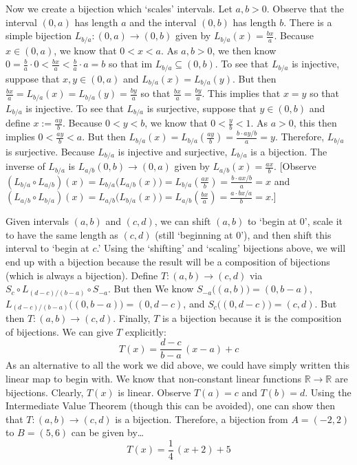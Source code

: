 \documentclass[11pt,letterpaper]{article}
\begin{document}
\begin{enumerate}[(a)]
Now we create a bijection which `scales' intervals. Let $a, b > 0$. Observe that the interval $(0, a)$ has length $a$ and the interval $(0, b)$ has length $b$. There is a simple bijection $L_{b/a}: (0, a) \to (0, b)$ given by $L_{b/a}(x)= \frac{bx}{a}$. Because $x \in (0, a)$, we know that $0 < x < a$. As $a, b > 0$, we then know $0= \frac{b}{a} \cdot 0 < \frac{bx}{a} < \frac{b}{a} \cdot a= b$ so that $\text{im } L_{b/a} \subseteq (0, b)$. To see that $L_{b/a}$ is injective, suppose that $x, y \in (0, a)$ and $L_{b/a}(x)= L_{b/a}(y)$. But then $\frac{bx}{a}= L_{b/a}(x)= L_{b/a}(y)= \frac{by}{a}$ so that $\frac{bx}{a}= \frac{by}{a}$. This implies that $x= y$ so that $L_{b/a}$ is injective. To see that $L_{b/a}$ is surjective, suppose that $y \in (0, b)$ and define $x:= \frac{ay}{b}$. Because $0 < y < b$, we know that $0 < \frac{y}{b} < 1$. As $a > 0$, this then implies $0 < \frac{ay}{b} < a$. But then $L_{b/a}(x)= L_{b/a}(\frac{ay}{b})= \frac{b \cdot ay/b}{a}= y$. Therefore, $L_{b/a}$ is surjective. Because $L_{b/a}$ is injective and surjective, $L_{b/a}$ is a bijection. The inverse of $L_{b/a}$ is $L_{a/b} (0, b) \to (0, a)$ given by $L_{a/b}(x)= \frac{ax}{b}$. [Observe $(L_{b/a} \circ L_{a/b})(x)= L_{b/a} \big( L_{a/b}(x) \big)= L_{b/a}(\frac{ax}{b})= \frac{b \cdot ax/b}{a}= x$ and $(L_{a/b} \circ L_{b/a})(x)= L_{a/b} \big( L_{b/a}(x) \big)= L_{a/b}(\frac{bx}{a})= \frac{a \cdot bx/a}{b}= x$.] \pspace

Given intervals $(a, b)$ and $(c, d)$, we can shift $(a, b)$ to `begin at $0$', scale it to have the same length as $(c, d)$ (still `beginning at $0$'), and then shift this interval to `begin at $c$.' Using the `shifting' and `scaling' bijections above, we will end up with a bijection because the result will be a composition of bijections (which is always a bijection). Define $T: (a, b) \to (c, d)$ via $S_c \circ L_{(d-c)/(b-a)} \circ S_{-a}$. But then We know $S_{-a} \big( (a, b) \big)= (0, b - a)$, $L_{(d-c)/(b-a)} \big( (0, b - a) \big)= (0, d - c)$, and $S_c \big( (0, d - c) \big)= (c, d)$. But then $T: (a, b) \to (c, d)$. Finally, $T$ is a bijection because it is the composition of bijections. We can give $T$ explicitly:
	\[
	T(x)= \dfrac{d - c}{b - a}\, (x - a) + c
	\]
As an alternative to all the work we did above, we could have simply written this linear map to begin with. We know that non-constant linear functions $\mathbb{R} \to \mathbb{R}$ are bijections. Clearly, $T(x)$ is linear. Observe $T(a)= c$ and $T(b)= d$. Using the Intermediate Value Theorem (though this can be avoided), one can show then that $T: (a, b) \to (c, d)$ is a bijection. Therefore, a bijection from $A= (-2, 2)$ to $B= (5, 6)$ can be given by\dots
	\[
	T(x)= \dfrac{1}{4} \, (x + 2) + 5
	\] \pspace


\end{enumerate}
\end{document}
